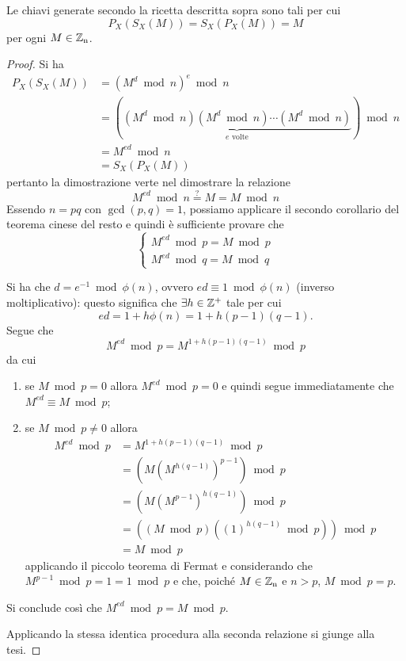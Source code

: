 \begin{proposizione}
Le chiavi generate secondo la ricetta descritta sopra sono tali per cui
\[
P_X(S_X(M))=S_X(P_X(M))=M
\]
per ogni $M\in\operatorname*{\mathbb{Z}_n}$.
\end{proposizione}
\begin{proof}
Si ha
\begin{align*}
P_X(S_X(M))&=(M^d\bmod n)^e\bmod n \\
&=(\underbrace{(M^d\bmod n)(M^d\bmod n)\cdots(M^d\bmod n)}_{e\text{ volte}})\bmod n \\
&=M^{ed}\bmod n \\
&=S_X(P_X(M))
\end{align*}
pertanto la dimostrazione verte nel dimostrare la relazione
\[
M^{ed}\bmod n \overset{?}{=} M = M\bmod n
\]
Essendo $n=pq$ con $\gcd(p,q)=1$, possiamo applicare il secondo corollario del teorema cinese del resto e quindi è sufficiente provare che 
\[
\begin{cases}
M^{ed}\bmod p = M\bmod p \\
M^{ed}\bmod q = M\bmod q
\end{cases}
\]

Si ha che $d=e^{-1}\bmod\phi(n)$, ovvero $ed\equiv 1\bmod\phi(n)$ (inverso moltiplicativo): questo significa che $\exists h\in\operatorname*{\mathbb{Z}^+}$ tale per cui
\[
ed=1+h\phi(n)=1+h(p-1)(q-1).
\]
Segue che
\[
M^{ed}\bmod p = M^{1+h(p-1)(q-1)}\bmod p
\]
da cui
\begin{enumerate}
\item se $M\bmod p=0$ allora $M^{ed}\bmod p=0$ e quindi segue immediatamente che $M^{ed}\equiv M\bmod p$;
\item se $M\bmod p\neq 0$ allora 
\begin{align*}
M^{ed}\bmod p &= M^{1+h(p-1)(q-1)}\bmod p \\
&=(M(M^{h(q-1)})^{p-1})\bmod p \\
&=(M(M^{p-1})^{h(q-1)})\bmod p \\
&=((M\bmod p)((1)^{h(q-1)}\bmod p))\bmod p \\
&=M\bmod p
\end{align*}
applicando il piccolo teorema di Fermat e considerando che $M^{p-1}\bmod p = 1 = 1\bmod p$ e che, poiché $M\in \operatorname*{\mathbb{Z}_n}$ e $n>p$, $M\bmod p = p$.
\end{enumerate}
Si conclude così che $M^{ed}\bmod p = M\bmod p$.

Applicando la stessa identica procedura alla seconda relazione si giunge alla tesi.
\end{proof}

